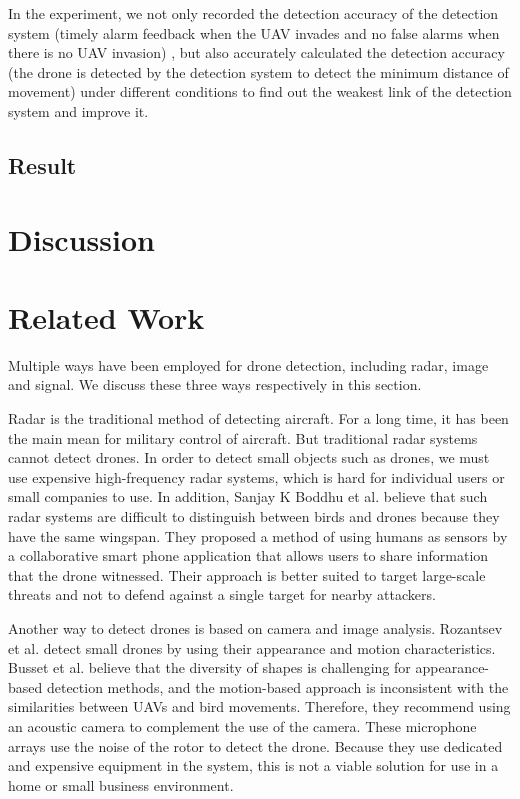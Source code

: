 \documentclass{sig-alternate-10pt}
\begin{document}
In the experiment, we not only recorded the detection accuracy of the detection system (timely alarm feedback when the UAV invades and no false alarms when there is no UAV invasion) , but also accurately calculated the detection accuracy (the drone is detected by the detection system to detect the minimum distance of movement) under different conditions to find out the weakest link of the detection system and improve it.



\subsection{Result}



\section{Discussion}


\section{Related Work}
Multiple ways have been employed for drone detection, including radar, image and signal. We discuss these three ways respectively in this section.

\hspace{1mm} 
Radar is the traditional method of detecting aircraft. For a long time, it has been the main mean for military control of aircraft. But traditional radar systems cannot detect drones. In order to detect small objects such as drones, we must use expensive high-frequency radar systems, which is hard for individual users or small companies to use. In addition, Sanjay K Boddhu et al. believe that such radar systems are difficult to distinguish between birds and drones because they have the same wingspan. They proposed a method of using humans as sensors by a collaborative smart phone application that allows users to share information that the drone witnessed. Their approach is better suited to target large-scale threats and not to defend against a single target for nearby attackers.

\hspace{1mm} 
Another way to detect drones is based on camera and image analysis. Rozantsev et al. detect small drones by using their appearance and motion characteristics. Busset et al. believe that the diversity of  shapes is challenging for appearance-based detection methods, and the motion-based approach is inconsistent with the similarities between UAVs and bird movements. Therefore, they recommend using an acoustic camera to complement the use of the camera. These microphone arrays use the noise of the rotor to detect the drone. Because they use dedicated and expensive equipment in the system, this is not a viable solution for use in a home or small business environment.
\end{document}
